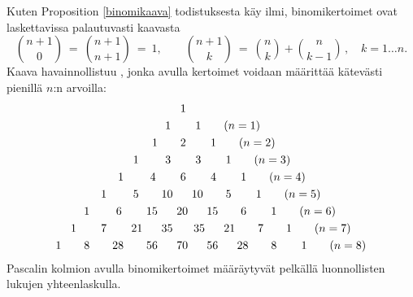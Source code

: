Kuten Proposition \ref{binomikaava} todistuksesta käy ilmi, binomikertoimet ovat laskettavissa
palautuvasti kaavasta
\[
\binom{n+1}{0}\ =\ \binom{n+1}{n+1}\ =\ 1, \quad \quad 
\binom{n+1}{k}\ =\ \binom{n}{k} + \binom{n}{k-1}\,, \quad k = 1 \ldots n.
\]
Kaava havainnollistuu 
%
, jonka avulla kertoimet voidaan määrittää 
kätevästi pienillä $n$:n arvoilla:
\begin{align}
                                        &\ 1                                     \notag \\
                                   1\,\ &\ \quad\ 1                              \tag{$n=1$} \\
                             1\ \ \quad &\ 2\,\qquad 1                           \tag{$n=2$} \\
                         1\ \qquad 3\,\ &\ \quad\ 3\,\qquad 1                    \tag{$n=3$} \\
                 1 \qquad\ 4\ \ \quad\, &\ 6\,\qquad 4\,\qquad 1                 \tag{$n=4$} \\
                  1\ \qquad 5\qquad 10\ &\ \quad 10 \qquad 5\,\qquad 1           \tag{$n=5$} \\
       1\ \qquad 6\,\qquad 15\ \ \quad  &20\ \ \quad 15 \qquad 6\,\qquad 1       \tag{$n=6$} \\
    1\,\qquad 7\,\qquad 21\ \ \quad 35\ &\,\ \quad 35 \ \ \quad 21 \qquad 7 \qquad 1  
                                                                                 \tag{$n=7$} \\
1 \qquad 8 \qquad 28 \qquad 56\ \ \quad &70\ \ \quad 56\ \ \quad 28 \qquad 8\,\qquad 1
                                                                                 \tag{$n=8$}
\end{align}
Pascalin kolmion avulla binomikertoimet määräytyvät pelkällä luonnollisten lukujen 
yhteenlaskulla.

